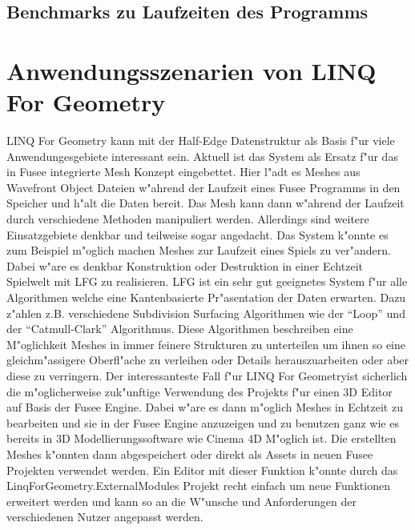 \documentclass[pagesize, paper=a4, fontsize=12pt,titlepage=true, headings=small, headnosepline, abstractoff, liststotoc, nochapterprefix, plainheadsepline]{scrreprt}
\newcommand{\LFG}{LINQ For Geometry}
\newcommand{\LFGS}{LINQ For Geometry }
\newcommand{\HES}{Half-Edge Datenstruktur }
\begin{document}
		\subsection {Benchmarks zu Laufzeiten des Programms}
	\section {Anwendungsszenarien von \LFG}
	\LFGS kann mit der \HES als Basis f"ur viele Anwendungesgebiete interessant sein. Aktuell ist das System als Ersatz f"ur das in Fusee integrierte Mesh Konzept eingebettet. Hier l"adt es Meshes aus Wavefront Object Dateien w"ahrend der Laufzeit eines Fusee Programms in den Speicher und h"alt die Daten bereit. Das Mesh kann dann w"ahrend der Laufzeit durch verschiedene Methoden manipuliert werden. Allerdings sind weitere Einsatzgebiete denkbar und teilweise sogar angedacht.
Das System k"onnte es zum Beispiel m"oglich machen Meshes zur Laufzeit eines Spiels zu ver"andern. Dabei w"are es denkbar Konstruktion oder Destruktion in einer Echtzeit Spielwelt mit LFG zu realisieren. LFG ist ein sehr gut geeignetes System f"ur alle Algorithmen welche eine Kantenbasierte Pr"asentation der Daten erwarten. Dazu z"ahlen z.B. verschiedene Subdivision Surfacing Algorithmen wie der "`Loop"' und der "`Catmull-Clark"' Algorithmus. Diese Algorithmen beschreiben eine M"oglichkeit Meshes in immer feinere Strukturen zu unterteilen um ihnen so eine gleichm"assigere Oberfl"ache zu verleihen oder Details herauszuarbeiten oder aber diese zu verringern.
Der interessanteste Fall f"ur \LFG ist sicherlich die m"oglicherweise zuk"unftige Verwendung des Projekts f"ur einen 3D Editor auf Basis der Fusee Engine. Dabei w"are es dann m"oglich Meshes in Echtzeit zu bearbeiten und sie in der Fusee Engine anzuzeigen und zu benutzen ganz wie es bereits in 3D Modellierungssoftware wie Cinema 4D M"oglich ist. Die erstellten Meshes k"onnten dann abgespeichert oder direkt als Assets in neuen Fusee Projekten verwendet werden. Ein Editor mit dieser Funktion k"onnte durch das LinqForGeometry.ExternalModules Projekt recht einfach um neue Funktionen erweitert werden und kann so an die W"unsche und Anforderungen der verschiedenen Nutzer angepasst werden.
\end{document}

